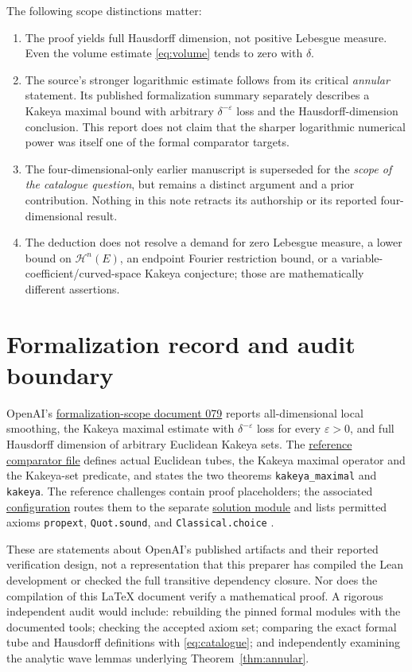 \documentclass[11pt,a4paper]{article}
\numberwithin{equation}{section}
\theoremstyle{definition}
\theoremstyle{remark}
\newcommand{\eps}{\varepsilon}
\newcommand{\Hs}{\mathcal H}
\newcommand{\pinlink}[2]{\href{https://github.com/openai/math/blob/7ef5c0cc5ca4b0e072b7a050fca09ab24bc6fa3a/#1}{#2}}
\begin{document}
The following scope distinctions matter:
\begin{enumerate}[label=(\alph*)]
\item The proof yields full Hausdorff dimension, not positive
Lebesgue measure. Even the volume estimate \eqref{eq:volume} tends
to zero with $\delta$.
\item The source's stronger logarithmic estimate follows from its
critical \emph{annular} statement. Its published formalization summary
separately describes a Kakeya maximal bound with arbitrary
$\delta^{-\eps}$ loss and the Hausdorff-dimension conclusion. This
report does not claim that the sharper logarithmic numerical power
was itself one of the formal comparator targets.
\item The four-dimensional-only earlier manuscript is superseded for
the \emph{scope of the catalogue question}, but remains a distinct
argument and a prior contribution. Nothing in this note retracts
its authorship or its reported four-dimensional result.
\item The deduction does not resolve a demand for zero Lebesgue measure,
a lower bound on $\Hs^n(E)$, an endpoint Fourier restriction bound, or
a variable-coefficient/curved-space Kakeya conjecture; those are
mathematically different assertions.
\end{enumerate}

\section{Formalization record and audit boundary}
\label{sec:lean}
OpenAI's \pinlink{lean/docs/079.md}{formalization-scope document 079}
reports all-dimensional local smoothing, the Kakeya maximal estimate
with $\delta^{-\eps}$ loss for every $\eps>0$, and full Hausdorff
dimension of arbitrary Euclidean Kakeya sets. The
\pinlink{lean/ComparatorChallenges/LocalSmoothing.lean}{reference
comparator file} defines actual Euclidean tubes, the Kakeya maximal
operator and the Kakeya-set predicate, and states the two theorems
\texttt{kakeya\_maximal} and \texttt{kakeya}. The reference challenges
contain proof placeholders; the associated
\pinlink{lean/ComparatorChallenges/LocalSmoothing.json}{configuration}
routes them to the separate
\pinlink{lean/OAI/Analysis/Fourier/LocalSmoothing/Comparator.lean}{solution
module} and lists permitted axioms \texttt{propext},
\texttt{Quot.sound}, and \texttt{Classical.choice} \cite{scope,challenge,config}.

These are statements about OpenAI's published artifacts and their
reported verification design, not a representation that this
preparer has compiled the Lean development or checked the full
transitive dependency closure. Nor does the compilation of this
\LaTeX{} document verify a mathematical proof. A rigorous
independent audit would include: rebuilding the pinned formal
modules with the documented tools; checking the accepted axiom set;
comparing the exact formal tube and Hausdorff definitions with
\eqref{eq:catalogue}; and independently examining the analytic wave
lemmas underlying Theorem~\ref{thm:annular}.
\end{document}
